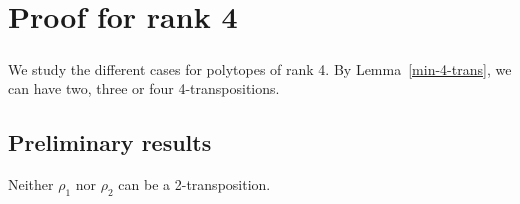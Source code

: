 \chapter{Proof for rank 4}
\label{proof-4}

\paragraph{}
We study the different cases for polytopes of rank 4. By Lemma~\ref{min-4-trans}, we can have two, three or four 4-transpositions.

\section{Preliminary results}

\begin{theorem}
  Neither $\rho_1$ nor $\rho_2$ can be a 2-transposition.
\end{theorem}

